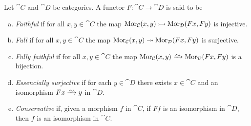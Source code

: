 \begin{definition}
\label{def:faithful-full-fully-faithful-essencially-surjective-conservative}
Let \(\cat C\) and \(\cat D\) be categories. A functor \(F: \cat C \to \cat D\)
is said to be
\begin{enumerate}[(a)]\setlength\itemsep{0em}
\item \emph{Faithful} if for all \(x, y \in \cat C\) the map \(\operatorname{Mor}_{\mathcal C}(x,
  y) \rightarrowtail \operatorname{Mor}_{\mathcal D}(F x, F y)\) is injective.
\item \emph{Full} if for all \(x, y \in \cat C\) the map \(\operatorname{Mor}_{\mathcal C}(x, y)
  \twoheadrightarrow \operatorname{Mor}_{\mathcal D}(F x, F y)\) is surjective.
\item \emph{Fully faithful} if for all \(x, y \in \cat C\) the map \(\Hom_{\cat
    C}(x, y) \isoto \Hom_{\cat D}(F x, F y)\) is a bijection.
\item \emph{Essencially surjective} if for each \(y \in \cat D\) there exists
  \(x \in \cat C\) and an isomorphism \(F x \isoto y\) in \(\cat D\).
\item \emph{Conservative} if, given a morphism \(f\) in \(\cat C\), if \(F f\)
  is an isomorphism in \(\cat D\), then \(f\) is an isomorphism in \(\cat C\).
\end{enumerate}
\end{definition}

